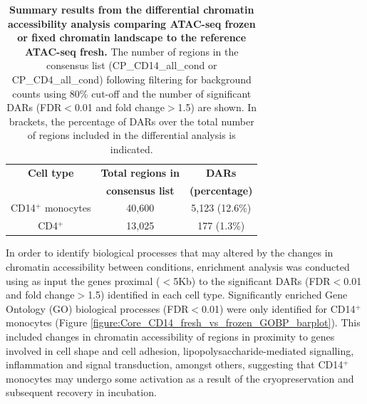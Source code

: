 	
	
\begin{table}[htbp]
\centering
\begin{tabular}{@{} c c c}
\toprule
\textbf{Cell type} & \textbf{Total regions in} & \textbf{DARs} \\
                   & \textbf{consensus list}   & \textbf{(percentage)} \\
\midrule
\midrule
CD14$^+$ monocytes & 40,600                    & 5,123 (12.6\%) \\
CD4$^+$            & 13,025                    & 177  (1.3\%) \\
\bottomrule
\end{tabular}
\medskip %
\caption[Summary results from the differential chromatin accessibility analysis comparing ATAC-seq frozen or fixed chromatin landscape to the reference ATAC-seq fresh.]{\textbf{Summary results from the differential chromatin accessibility analysis comparing ATAC-seq frozen or fixed chromatin landscape to the reference ATAC-seq fresh.} The number of regions in the consensus list (CP\_CD14\_all\_cond or CP\_CD4\_all\_cond) following filtering for background counts using 80\% cut-off and the number of significant DARs (FDR$<$0.01 and fold change$>$1.5) are shown. In brackets, the percentage of DARs over the total number of regions included in the differential analysis is indicated.}
\label{tab:Core_ATAC_all_conditions_DARs}
\end{table}
\bigskip %


In order to identify biological processes that may altered by the changes in chromatin accessibility between conditions, enrichment analysis was conducted using as input the genes proximal ($<$5Kb) to the significant DARs (FDR$<$0.01 and fold change$>$1.5) identified in each cell type. Significantly enriched Gene Ontology (GO) biological processes (FDR$<$0.01) were only identified for CD14$^+$ monocytes (Figure \ref{figure:Core_CD14_fresh_vs_frozen_GOBP_barplot}). This included changes in chromatin accessibility of regions in proximity to genes involved in cell shape and cell adhesion, lipopolysaccharide-mediated signalling, inflammation and signal transduction, amongst others, suggesting that CD14$^+$ monocytes may undergo some activation as a result of the cryopreservation and subsequent recovery in incubation. 



